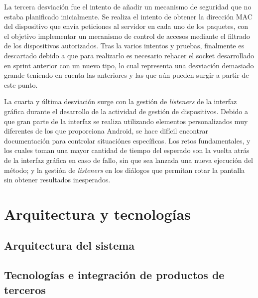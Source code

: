\documentclass[12pt]{article}
\begin{document}
        La tercera desviación fue el intento de añadir un mecanismo de seguridad que no estaba planificado inicialmente. Se realiza el intento de obtener la dirección MAC del dispositivo que envía peticiones al servidor en cada uno de los paquetes, con el objetivo implementar un mecanismo de control de accesos mediante el filtrado de los dispositivos autorizados. Tras la varios intentos y pruebas, finalmente es descartado debido a que para realizarlo es necesario rehacer el socket desarrollado en sprint anterior con un nuevo tipo, lo cual representa una desviación demasiado grande teniendo en cuenta las anteriores y las que aún pueden surgir a partir de este punto.

        La cuarta y última desviación surge con la gestión de \textit{listeners} de la interfaz gráfica durante el desarrollo de la actividad de gestión de dispositivos. Debido a que gran parte de la interfaz se realiza utilizando elementos personalizados muy diferentes de los que proporciona Android, se hace difícil encontrar documentación para controlar situaciónes específicas. Los retos fundamentales, y los cuales toman una mayor cantidad de tiempo del esperado son la vuelta atrás de la interfaz gráfica en caso de fallo, sin que sea lanzada una nueva ejecución del método; y la gestión de \textit{listeners} en los diálogos que permitan rotar la pantalla sin obtener resultados inesperados.
        


\section{Arquitectura y tecnologías}

    \subsection{Arquitectura del sistema}

    \subsection{Tecnologías e integración de productos de terceros}
\end{document}
